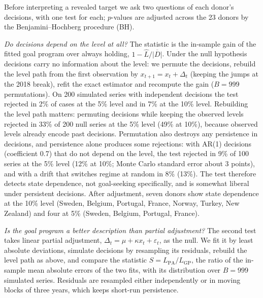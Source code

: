 \documentclass[pdflatex,sn-basic]{sn-jnl}
\theoremstyle{thmstyleone}\newtheorem{proposition}{Proposition}\newtheorem{theorem}{Theorem}
\theoremstyle{thmstylethree}\newtheorem{remark}{Remark}
\begin{document}
Before interpreting a revealed target we ask two questions of each donor's decisions, with one test for each; $p$-values are adjusted across the 23 donors by the Benjamini--Hochberg procedure (BH).

\emph{Do decisions depend on the level at all?} The statistic is the in-sample gain of the fitted goal program over always holding, $1-\hat L/\overline{|D|}$. Under the null hypothesis decisions carry no information about the level: we permute the decisions, rebuild the level path from the first observation by $x_{t+1}=x_t+\Delta_t$ (keeping the jumps at the 2018 break), refit the exact estimator and recompute the gain ($B=999$ permutations). On 200 simulated series with independent decisions the test rejected in 2\% of cases at the 5\% level and in 7\% at the 10\% level. Rebuilding the level path matters: permuting decisions while keeping the observed levels rejected in 33\% of 200 null series at the 5\% level (49\% at 10\%), because observed levels already encode past decisions. Permutation also destroys any persistence in decisions, and persistence alone produces some rejections: with AR(1) decisions (coefficient 0.7) that do not depend on the level, the test rejected in 9\% of 100 series at the 5\% level (12\% at 10\%; Monte Carlo standard error about 3 points), and with a drift that switches regime at random in 8\% (13\%). The test therefore detects state dependence, not goal-seeking specifically, and is somewhat liberal under persistent decisions. After adjustment, seven donors show state dependence at the 10\% level (Sweden, Belgium, Portugal, France, Norway, Turkey, New Zealand) and four at 5\% (Sweden, Belgium, Portugal, France).

\emph{Is the goal program a better description than partial adjustment?} The second test takes linear partial adjustment, $\Delta_t=\mu+\kappa x_t+\varepsilon_t$, as the null. We fit it by least absolute deviations, simulate decisions by resampling its residuals, rebuild the level path as above, and compare the statistic $S=L_{\mathrm{PA}}/L_{\mathrm{GP}}$, the ratio of the in-sample mean absolute errors of the two fits, with its distribution over $B=999$ simulated series. Residuals are resampled either independently or in moving blocks of three years, which keeps short-run persistence.
\end{document}

